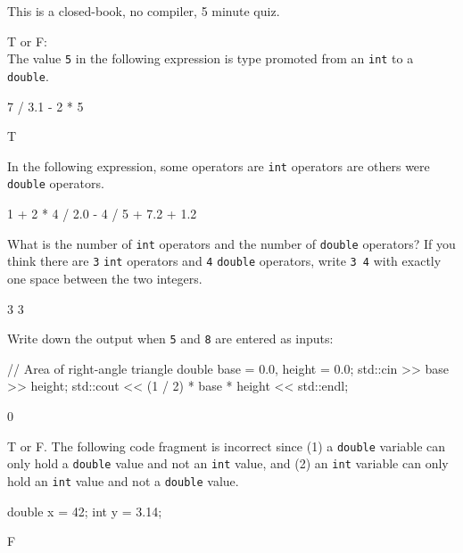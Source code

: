 

This is a closed-book, no compiler, 5 minute quiz.

\nextq
T or F:
\\
The value \verb!5! in the following expression is
type promoted from an \verb!int! to a \verb!double!.
\begin{console}[fontsize=\small]
7 / 3.1 - 2 * 5
\end{console}
\ANSWER
\begin{answercode}
T
\end{answercode}

\nextq
In the following expression, some operators are \verb!int!
operators are others were \verb!double! operators.
\begin{console}[fontsize=\small]
1 + 2 * 4 / 2.0 - 4 / 5 + 7.2 + 1.2
\end{console}
What is the number of \verb!int! operators and the number of
\verb!double! operators?
If you think there are \verb!3! \verb!int! operators and
\verb!4! \verb!double! operators, write \verb!3 4! with
exactly one space between the two integers.
\\
\ANSWER
\begin{answercode}
3 3 
\end{answercode}

\nextq
Write down the output when
\verb!5! and \verb!8! are entered as inputs:
\begin{console}[fontsize=\small]
// Area of right-angle triangle
double base = 0.0, height = 0.0;
std::cin >> base >> height;
std::cout << (1 / 2) * base * height << std::endl;
\end{console}
\ANSWER
\begin{answercode}
0
\end{answercode}

\nextq
T or F.
The following code fragment is incorrect since
(1) a \verb!double! variable can only hold a \verb!double! value
and not an \verb!int! value, and
(2) an \verb!int! variable can only hold an \verb!int! value
and not a \verb!double! value.
\begin{console}[fontsize=\small]
double x = 42;
int y = 3.14;
\end{console}
\ANSWER
\begin{answercode}
F
\end{answercode}


